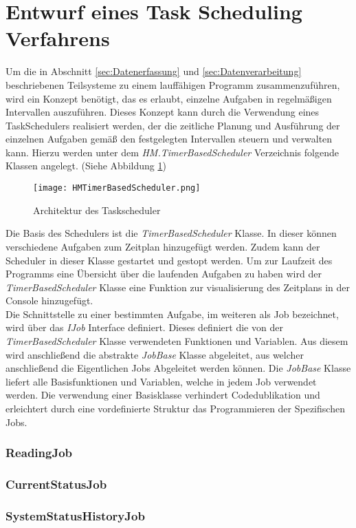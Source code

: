 \newpage
\section{Entwurf eines Task Scheduling Verfahrens}\label{sec:Gesamtkonzept}
Um die in Abschnitt \ref{sec:Datenerfassung} und \ref{sec:Datenverarbeitung} beschriebenen Teilsysteme zu einem lauffähigen Programm zusammenzuführen, wird ein Konzept benötigt, das es erlaubt, einzelne Aufgaben in regelmäßigen Intervallen auszuführen. Dieses Konzept kann durch die Verwendung eines TaskSchedulers realisiert werden, der die zeitliche Planung und Ausführung der einzelnen Aufgaben gemäß den festgelegten Intervallen steuern und verwalten kann. Hierzu werden unter dem \textit{HM.TimerBasedScheduler} Verzeichnis folgende Klassen angelegt. (Siehe Abbildung \ref{fig:TimerBasedScheduler}) 
\begin{center}
    \begin{figure}[h!]
        \centering
        \texttt{[image: HMTimerBasedScheduler.png]}
        \caption{Architektur des Taskscheduler}
        \label{fig:TimerBasedScheduler}
    \end{figure}
\end{center}
Die Basis des Schedulers ist die \textit{TimerBasedScheduler} Klasse. In dieser können verschiedene Aufgaben zum Zeitplan hinzugefügt werden. Zudem kann der Scheduler in dieser Klasse gestartet und gestopt werden. Um zur Laufzeit des Programms eine Übersicht über die laufenden Aufgaben zu haben wird der \textit{TimerBasedScheduler} Klasse eine Funktion zur visualisierung des Zeitplans in der Console hinzugefügt.\\
Die Schnittstelle zu einer bestimmten Aufgabe, im weiteren als Job bezeichnet, wird über das \textit{IJob} Interface definiert. Dieses definiert die von der \textit{TimerBasedScheduler} Klasse verwendeten Funktionen und Variablen. Aus diesem wird anschließend die abstrakte \textit{JobBase} Klasse abgeleitet, aus welcher anschließend die Eigentlichen Jobs Abgeleitet werden können. Die \textit{JobBase} Klasse liefert alle Basisfunktionen und Variablen, welche in jedem Job verwendet werden. Die verwendung einer Basisklasse verhindert Codedublikation und erleichtert durch eine vordefinierte Struktur das Programmieren der Spezifischen Jobs. \\

\subsubsection*{ReadingJob}

\subsubsection*{CurrentStatusJob}

\subsubsection*{SystemStatusHistoryJob}